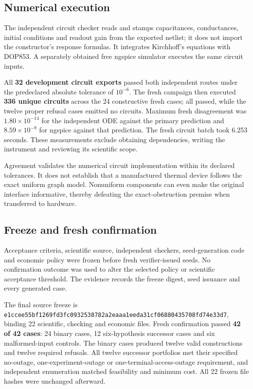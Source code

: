 \documentclass[
  11pt,
]{article}
\begin{document}
\hypertarget{numerical-execution}{%
\subsection{Numerical execution}\label{numerical-execution}}

The independent circuit checker reads and stamps capacitances,
conductances, initial conditions and readout gain from the exported
netlist; it does not import the constructor's response formulas. It
integrates Kirchhoff's equations with DOP853. A separately obtained free
ngspice simulator executes the same circuit inputs.

All \textbf{32 development circuit exports} passed both independent
routes under the predeclared absolute tolerance of \(10^{-6}\). The
fresh campaign then executed \textbf{336 unique circuits} across the 24
constructive fresh cases; all passed, while the twelve proper refusal
cases emitted no circuits. Maximum fresh disagreement was
\(1.80\times10^{-14}\) for the independent ODE against the primary
prediction and \(8.59\times10^{-9}\) for ngspice against that
prediction. The fresh circuit batch took 6.253 seconds. These
measurements exclude obtaining dependencies, writing the instrument and
reviewing its scientific scope.

Agreement validates the numerical circuit implementation within its
declared tolerances. It does not establish that a manufactured thermal
device follows the exact uniform graph model. Nonuniform components can
even make the original interface informative, thereby defeating the
exact-obstruction premise when transferred to hardware.

\hypertarget{freeze-and-fresh-confirmation}{%
\subsection{Freeze and fresh
confirmation}\label{freeze-and-fresh-confirmation}}

Acceptance criteria, scientific source, independent checkers,
seed-generation code and economic policy were frozen before fresh
verifier-issued seeds. No confirmation outcome was used to alter the
selected policy or scientific acceptance threshold. The evidence records
the freeze digest, seed issuance and every generated case.

The final source freeze is
\texttt{e1ccee55bf1269fd3fc0932538782a2eaaa1eeda31cf06880435708fd74e33d7},
binding 22 scientific, checking and economic files. Fresh confirmation
passed \textbf{42 of 42 cases}: 24 binary cases, 12 six-hypothesis
successor cases and six malformed-input controls. The binary cases
produced twelve valid constructions and twelve required refusals. All
twelve successor portfolios met their specified no-outage,
one-experiment-outage or one-terminal-access-outage requirement, and
independent enumeration matched feasibility and minimum cost. All 22
frozen file hashes were unchanged afterward.
\end{document}
